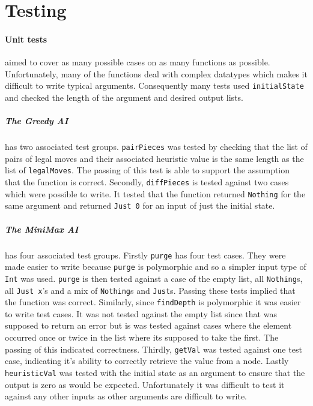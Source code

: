 \documentclass[11pt]{article}
\begin{document}
\section{Testing}%
\paragraph{Unit tests} aimed to cover as many possible cases on as many functions as possible. Unfortunately, many of the functions deal with complex datatypes which makes it difficult to write typical arguments. Consequently many tests used \verb|initialState| and checked the length of the argument and desired output lists.

\subparagraph{The Greedy AI} has two associated test groups. \verb|pairPieces| was tested by checking that the list of pairs of legal moves and their associated heuristic value is the same length as the list of \verb|legalMoves|. The passing of this test is able to support the assumption that the function is correct. Secondly, \verb|diffPieces| is tested against two cases which were possible to write. It tested that the function returned \verb|Nothing| for the same argument and returned \verb|Just 0| for an input of just the initial state.

\subparagraph{The MiniMax AI} has four associated test groups. Firstly \verb|purge| has four test cases. They were made easier to write because \verb|purge| is polymorphic and so a simpler input type of \verb|Int| was used. \verb|purge| is then tested against a case of the empty list, all \verb|Nothing|s, all \verb|Just x|'s and a mix of \verb|Nothing|s and \verb|Just|s. Passing these tests implied that the function was correct. Similarly, since \verb|findDepth| is polymorphic it was easier to write test cases. It was not tested against the empty list since that was supposed to return an error but is was tested against cases where the element occurred once or twice in the list where its supposed to take the first. The passing of this indicated correctness. Thirdly, \verb|getVal| was tested against one test case, indicating it's ability to correctly retrieve the value from a node. Lastly \verb|heuristicVal| was tested with the initial state as an argument to ensure that the output is zero as would be expected. Unfortunately it was difficult to test it against any other inputs as other arguments are difficult to write.
\end{document}
